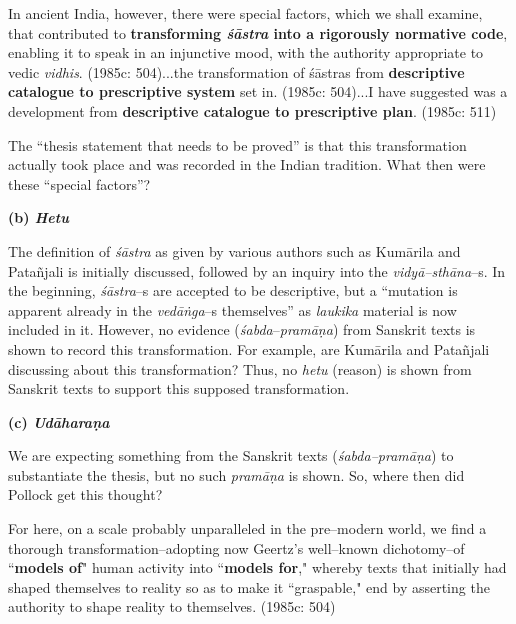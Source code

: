 \begin{myquote}
In ancient India, however, there were special factors, which we shall examine, that contributed to \textbf{transforming \textit{śāstra} into a rigorously normative code}, enabling it to speak in an injunctive mood, with the authority appropriate to vedic \textit{vidhis}. (1985c: 504)...the transformation of śāstras from \textbf{descriptive catalogue to prescriptive system} set in. (1985c: 504)...I have suggested was a development from \textbf{descriptive catalogue to prescriptive plan}. (1985c: 511)
\end{myquote}

The “thesis statement that needs to be proved” is that this transformation actually took place and was recorded in the Indian tradition. What then were these “special factors”?

\textbf{(b) \textit{Hetu}}

The definition of \textit{śāstra} as given by various authors such as Kumārila and Patañjali is initially discussed, followed by an inquiry into the \textit{vidyā–sthāna}–s. In the beginning, \textit{śāstra}–s are accepted to be descriptive, but a “mutation is apparent already in the \textit{vedāṅga}–s themselves” as \textit{laukika} material is now included in it. However, no evidence (\textit{śabda}–\textit{pramāṇa}) from Sanskrit texts is shown to record this transformation. For example, are Kumārila and Patañjali discussing about this transformation? Thus, no \textit{hetu} (reason) is shown from Sanskrit texts to support this supposed transformation.

\textbf{(c) \textit{Udāharaṇa}}

We are expecting something from the Sanskrit texts (\textit{śabda–pramāṇa}) to substantiate the thesis, but no such \textit{pramāṇa} is shown. So, where then did Pollock get this thought?

\begin{myquote}
For here, on a scale probably unparalleled in the pre–modern world, we find a thorough transformation–adopting now Geertz's well–known dichotomy–of ``\textbf{models of}" human activity into ``\textbf{models for}," whereby texts that initially had shaped themselves to reality so as to make it ``graspable," end by asserting the authority to shape reality to themselves. (1985c: 504)
\end{myquote}

